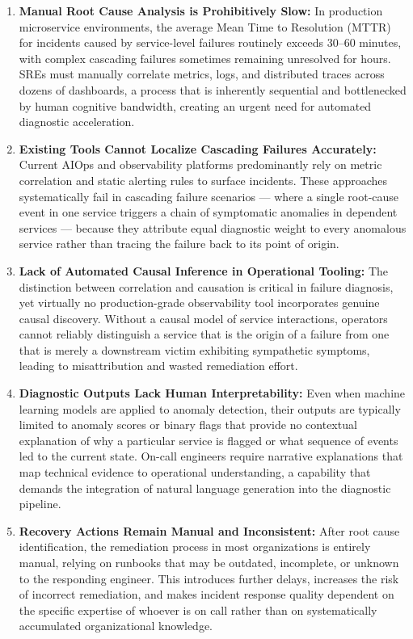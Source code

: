 \begin{enumerate}
    \item \textbf{Manual Root Cause Analysis is Prohibitively Slow:} In production microservice environments, the average Mean Time to Resolution (MTTR) for incidents caused by service-level failures routinely exceeds 30–60 minutes, with complex cascading failures sometimes remaining unresolved for hours. SREs must manually correlate metrics, logs, and distributed traces across dozens of dashboards, a process that is inherently sequential and bottlenecked by human cognitive bandwidth, creating an urgent need for automated diagnostic acceleration.

    \item \textbf{Existing Tools Cannot Localize Cascading Failures Accurately:} Current AIOps and observability platforms predominantly rely on metric correlation and static alerting rules to surface incidents. These approaches systematically fail in cascading failure scenarios — where a single root-cause event in one service triggers a chain of symptomatic anomalies in dependent services — because they attribute equal diagnostic weight to every anomalous service rather than tracing the failure back to its point of origin.

    \item \textbf{Lack of Automated Causal Inference in Operational Tooling:} The distinction between correlation and causation is critical in failure diagnosis, yet virtually no production-grade observability tool incorporates genuine causal discovery. Without a causal model of service interactions, operators cannot reliably distinguish a service that is the origin of a failure from one that is merely a downstream victim exhibiting sympathetic symptoms, leading to misattribution and wasted remediation effort.

    \item \textbf{Diagnostic Outputs Lack Human Interpretability:} Even when machine learning models are applied to anomaly detection, their outputs are typically limited to anomaly scores or binary flags that provide no contextual explanation of why a particular service is flagged or what sequence of events led to the current state. On-call engineers require narrative explanations that map technical evidence to operational understanding, a capability that demands the integration of natural language generation into the diagnostic pipeline.

    \item \textbf{Recovery Actions Remain Manual and Inconsistent:} After root cause identification, the remediation process in most organizations is entirely manual, relying on runbooks that may be outdated, incomplete, or unknown to the responding engineer. This introduces further delays, increases the risk of incorrect remediation, and makes incident response quality dependent on the specific expertise of whoever is on call rather than on systematically accumulated organizational knowledge.


\end{enumerate}
